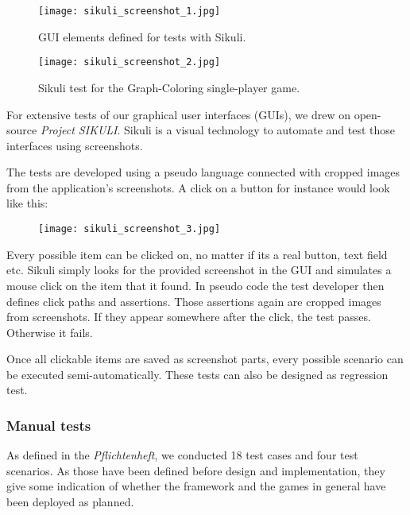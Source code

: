 \begin{figure}[!h]
	\centering
	\texttt{[image: sikuli\_screenshot\_1.jpg]}
	\caption{GUI elements defined for tests with Sikuli.}
	\label{img:screenSikuli1}
\end{figure}
\begin{figure}[!h]
	\centering
	\texttt{[image: sikuli\_screenshot\_2.jpg]}
	\caption{Sikuli test for the Graph-Coloring single-player game.}
	\label{img:screenSikuli2}
\end{figure}
For extensive tests of our graphical user interfaces (GUIs), we drew on open-source \emph{Project SIKULI}. Sikuli is a visual technology to automate and test those interfaces using screenshots.\par
The tests are developed using a pseudo language connected with cropped images from the application's screenshots. A click on a button for instance would look like this:\par
\begin{figure}[!h]
	\texttt{[image: sikuli\_screenshot\_3.jpg]}
	\label{img:screenSikuli3}
\end{figure}
Every possible item can be clicked on, no matter if its a real button, text field etc. Sikuli simply looks for the provided screenshot in the GUI and simulates a mouse click on the item that it found. In pseudo code the test developer then defines click paths and assertions. Those assertions again are cropped images from screenshots. If they appear somewhere after the click, the test passes. Otherwise it fails.\par
Once all clickable items are saved as screenshot parts, every possible scenario can be executed semi-automatically. These tests can also be designed as regression test.\par

\subsubsection{Manual tests}

As defined in the \emph{Pflichtenheft}, we conducted 18 test cases and four test scenarios. As those have been defined before design and implementation, they give some indication of whether the framework and the games in general have been deployed as planned.\par

